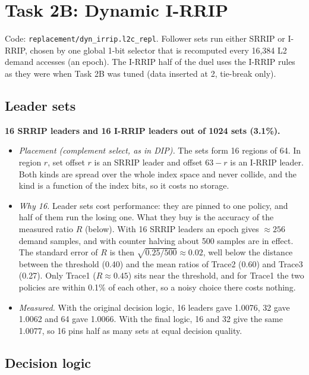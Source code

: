 \documentclass[12pt]{report}
\newcommand{\cfg}[1]{\texttt{#1}}
\begin{document}
\chapter{Task 2B: Dynamic I-RRIP}

Code: \cfg{replacement/dyn\_irrip.l2c\_repl}. Follower sets run either SRRIP
or I-RRIP, chosen by one global 1-bit selector that is recomputed every 16,384
L2 demand accesses (an epoch). The I-RRIP half of the duel uses the I-RRIP
rules as they were when Task 2B was tuned (data inserted at 2, tie-break
only).

\section{Leader sets}

\textbf{16 SRRIP leaders and 16 I-RRIP leaders out of 1024 sets (3.1\%).}
\begin{itemize}
\item \emph{Placement (complement select, as in DIP).} The sets form 16
  regions of 64. In region $r$, set offset $r$ is an SRRIP leader and offset
  $63-r$ is an I-RRIP leader. Both kinds are spread over the whole index
  space and never collide, and the kind is a function of the index bits, so
  it costs no storage.
\item \emph{Why 16.} Leader sets cost performance: they are pinned to one
  policy, and half of them run the losing one. What they buy is the accuracy
  of the measured ratio $R$ (below). With 16 SRRIP leaders an epoch gives
  $\approx256$ demand samples, and with counter halving about 500 samples
  are in effect. The standard error of $R$ is then
  $\sqrt{0.25/500}\approx0.02$, well below the distance between the
  threshold (0.40) and the mean ratios of Trace2 (0.60) and Trace3 (0.27).
  Only Trace1 ($R\approx0.45$) sits near the threshold, and for Trace1 the
  two policies are within 0.1\% of each other, so a noisy choice there costs
  nothing.
\item \emph{Measured.} With the original decision logic, 16 leaders gave
  1.0076, 32 gave 1.0062 and 64 gave 1.0066. With the final logic, 16 and 32
  give the same 1.0077, so 16 pins half as many sets at equal decision
  quality.
\end{itemize}

\section{Decision logic}
\end{document}
